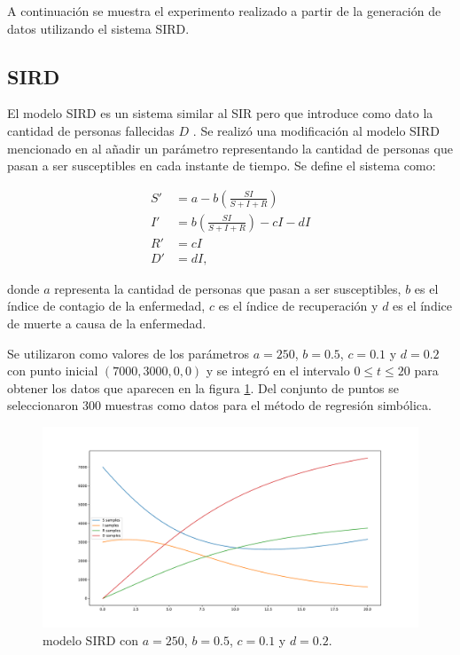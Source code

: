 A continuación se muestra el experimento realizado a partir de la generación de datos utilizando el sistema SIRD.

\subsection{SIRD}

El modelo SIRD es un sistema similar al SIR pero que introduce como dato la cantidad de personas fallecidas $D$ \cite{bailey1975mathematical}. Se realizó una modificación al modelo SIRD mencionado en \cite{bailey1975mathematical} al añadir un parámetro representando la cantidad de personas que pasan a ser susceptibles en cada instante de tiempo. Se define el sistema como:

\begin{align*}
    S' & = a - b (\frac{S I}{S + I + R})         \\
    I' & = b (\frac{S I}{S + I + R}) - c I - d I \\
    R' & = c I                                   \\
    D' & = d I,
\end{align*}

donde $a$ representa la cantidad de personas que pasan a ser susceptibles, $b$ es el índice de contagio de la enfermedad, $c$ es el índice de recuperación y $d$ es el índice de muerte a causa de la enfermedad.

Se utilizaron como valores de los parámetros $a = 250$, $b = 0.5$, $c = 0.1$ y $d = 0.2$ con punto inicial $(7000, 3000, 0, 0)$ y se integró en el intervalo $0 \leq t \leq 20$ para obtener los datos que aparecen en la figura \ref{fig:SIRD}. Del conjunto de puntos se seleccionaron 300 muestras como datos para el método de regresión simbólica.

\begin{figure}[h]
    \centering
    \includegraphics[width=\textwidth]{"figures/SIRD.pdf"}
    \caption{modelo SIRD con $a = 250$, $b = 0.5$, $c = 0.1$ y $d = 0.2$.}
    \label{fig:SIRD}
\end{figure}

